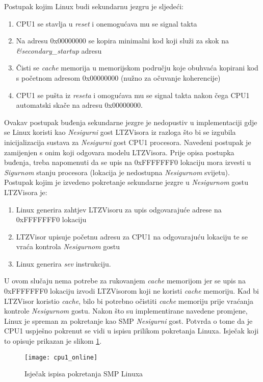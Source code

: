 \documentclass[times, utf8, diplomski, numeric]{fer}
\begin{document}
Postupak kojim Linux budi sekundarnu jezgru je sljedeći:
\begin{enumerate}
  \item{CPU1 se stavlja u \textit{reset} i onemogućava mu se signal takta}
  \item{Na adresu 0x00000000 se kopira minimalni kod koji služi za skok na \textit{\&secondary\_startup} adresu}
  \item{Čisti se \textit{cache} memorija u memorijskom području koje obuhvaća kopirani kod s početnom adresom
  0x00000000 (nužno za očuvanje koherencije)}
  \item{CPU1 se pušta iz \textit{reseta} i omogućava mu se signal takta nakon čega CPU1 automatski skače na adresu
  0x00000000.}
\end{enumerate}
Ovakav postupak buđenja sekundarne jezgre je nedopustiv u implementaciji gdje se Linux koristi kao \textit{Nesigurni} gost
LTZVisora iz razloga što bi se izgubila inicijalizacija sustava za \textit{Nesigurni} gost CPU1 procesora. Navedeni postupak
je zamijenjen s onim koji odgovara modelu LTZVisora. Prije opisa postupka buđenja, treba napomenuti da se upis na
0xFFFFFFF0 lokaciju mora izvesti u \textit{Sigurnom} stanju procesora (lokacija je nedostupna \textit{Nesigurnom}
svijetu). Postupak kojim je izvedeno pokretanje sekundarne jezgre u \textit{Nesigurnom} gostu LTZVisora je:
\begin{enumerate}
  \item {Linux generira zahtjev LTZVisoru za upis odgovarajuće adrese na 0xFFFFFFF0 lokaciju}
  \item{LTZVisor upisuje početnu adresu za CPU1 na odgovarajuću lokaciju te se vraća kontrola \textit{Nesigurnom} gostu}
  \item{Linux generira \textit{sev} instrukciju.}
\end{enumerate}
U ovom slučaju nema potrebe za rukovanjem \textit{cache} memorijom jer se upis na 0xFFFFFFF0 lokaciju izvodi
LTZVisorom koji ne koristi \textit{cache} memoriju. Kad bi LTZVisor koristio \textit{cache}, bilo bi potrebno očistiti
\textit{cache} memoriju prije vraćanja kontrole \textit{Nesigurnom} gostu. Nakon što su implementirane navedene promjene,
Linux je spreman za pokretanje kao SMP \textit{Nesigurni} gost. Potvrda o tome da je CPU1 uspješno pokrenut se vidi u ispisu
prilikom pokretanja Linuxa. Isječak koji to opisuje prikazan je slikom \ref{smp_boot_secondary}.
\begin{figure}[H]
  \centering
  \texttt{[image: cpu1\_online]}
  \caption{Isječak ispisa pokretanja SMP Linuxa}
  \label{smp_boot_secondary}
\end{figure}
\end{document}
